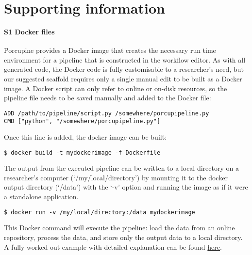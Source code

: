 \section{Supporting information}
\paragraph*{S1 Docker files}
\label{app:docker}
Porcupine provides a Docker image that creates the necessary run time environment for a pipeline that is constructed in the workflow editor. As with all generated code, the Docker code is fully customisable to a researcher's need, but our suggested scaffold requires only a single manual edit to be built as a Docker image. A Docker script can only refer to online or on-disk resources, so the pipeline file needs to be saved manually and added to the Docker file:
\begin{lstlisting}
ADD /path/to/pipeline/script.py /somewhere/porcupipeline.py
CMD ["python", "/somewhere/porcupipeline.py"]
\end{lstlisting}
Once this line is added, the docker image can be built:
\begin{lstlisting}
$ docker build -t mydockerimage -f Dockerfile
\end{lstlisting}
The output from the executed pipeline can be written to a local directory on a researcher's computer (`/my/local/directory') by mounting it to the docker output directory (`/data') with the `-v' option and running the image as if it were a standalone application.
\begin{lstlisting}
$ docker run -v /my/local/directory:/data mydockerimage
\end{lstlisting}
This Docker command will execute the pipeline: load the data from an online repository, process the data, and store only the output data to a local directory. A fully worked out example with detailed explanation can be found \href{https://timvanmourik.github.io/Porcupine/documentation/basics/building-dockerfiles}{here}.